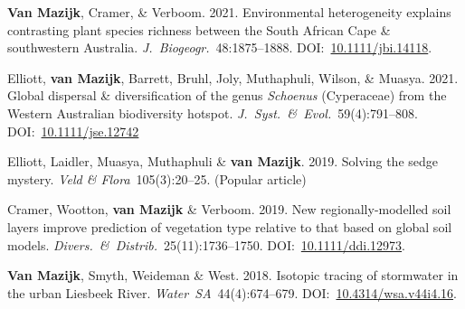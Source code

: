 \begin{hangparas}{2em}{1}

\textbf{Van Mazijk}, Cramer, \& Verboom.
2021.
Environmental heterogeneity explains contrasting plant species richness between
the South African Cape \& southwestern Australia.
\textit{J.~Biogeogr.}~48:1875--1888.
DOI:~\href{https://doi.org/10.1111/jbi.14118}{10.1111/jbi.14118}.

Elliott, \textbf{van Mazijk}, Barrett, Bruhl,
Joly, Muthaphuli, Wilson, \& Muasya.
2021.
Global dispersal \& diversification of the genus \textit{Schoenus} (Cyperaceae)
from the Western Australian biodiversity hotspot.
\textit{J.~Syst.~\&~Evol.}~59(4):791--808.
DOI:~\href{https://doi.org/10.1111/jse.1274}{10.1111/jse.12742}

Elliott, Laidler, Muasya, Muthaphuli \& \textbf{van Mazijk}.
2019.
Solving the sedge mystery.
\textit{Veld \& Flora}~105(3):20--25.
(Popular article)

Cramer, Wootton, \textbf{van Mazijk} \& Verboom.
2019.
New regionally-modelled soil layers improve prediction of vegetation type
relative to that based on global soil models.
\textit{Divers.~\&~Distrib.}~25(11):1736--1750.
DOI:~\href{https://doi.org/10.1111/ddi.12973}{10.1111/ddi.12973}.

\textbf{Van Mazijk}, Smyth, Weideman \& West.
2018.
Isotopic tracing of stormwater in the urban Liesbeek River.
\textit{Water~SA}~44(4):674--679.
DOI:~\href{https://doi.org/10.4314/wsa.v44i4.16}{10.4314/wsa.v44i4.16}.

\end{hangparas}
